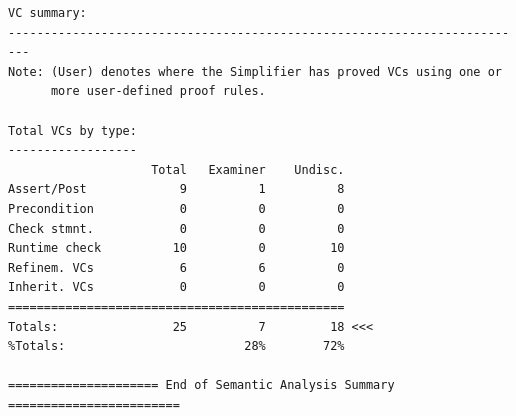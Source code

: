 \documentclass[a4paper, titlepage]{article}
\begin{document}
{\begin{lstlisting}
VC summary:
-------------------------------------------------------------------------
Note: (User) denotes where the Simplifier has proved VCs using one or
      more user-defined proof rules.

Total VCs by type:
------------------
                    Total   Examiner    Undisc.
Assert/Post             9          1          8
Precondition            0          0          0
Check stmnt.            0          0          0
Runtime check          10          0         10
Refinem. VCs            6          6          0
Inherit. VCs            0          0          0
===============================================
Totals:                25          7         18 <<<
%Totals:                         28%        72%

===================== End of Semantic Analysis Summary ========================
\end{lstlisting}
}
\end{document}
